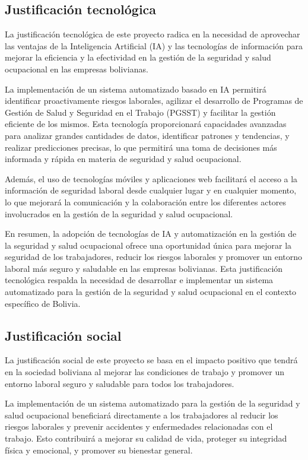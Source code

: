 \subsection{Justificación tecnológica}

La justificación tecnológica de este proyecto radica en la necesidad de aprovechar las ventajas de la Inteligencia Artificial (IA) y las tecnologías de información para mejorar la eficiencia y la efectividad en la gestión de la seguridad y salud ocupacional en las empresas bolivianas.

La implementación de un sistema automatizado basado en IA permitirá identificar proactivamente riesgos laborales, agilizar el desarrollo de Programas de Gestión de Salud y Seguridad en el Trabajo (PGSST) y facilitar la gestión eficiente de los mismos. Esta tecnología proporcionará capacidades avanzadas para analizar grandes cantidades de datos, identificar patrones y tendencias, y realizar predicciones precisas, lo que permitirá una toma de decisiones más informada y rápida en materia de seguridad y salud ocupacional.

Además, el uso de tecnologías móviles y aplicaciones web facilitará el acceso a la información de seguridad laboral desde cualquier lugar y en cualquier momento, lo que mejorará la comunicación y la colaboración entre los diferentes actores involucrados en la gestión de la seguridad y salud ocupacional.

En resumen, la adopción de tecnologías de IA y automatización en la gestión de la seguridad y salud ocupacional ofrece una oportunidad única para mejorar la seguridad de los trabajadores, reducir los riesgos laborales y promover un entorno laboral más seguro y saludable en las empresas bolivianas. Esta justificación tecnológica respalda la necesidad de desarrollar e implementar un sistema automatizado para la gestión de la seguridad y salud ocupacional en el contexto específico de Bolivia.

\subsection{Justificación social}

La justificación social de este proyecto se basa en el impacto positivo que tendrá en la sociedad boliviana al mejorar las condiciones de trabajo y promover un entorno laboral seguro y saludable para todos los trabajadores.

La implementación de un sistema automatizado para la gestión de la seguridad y salud ocupacional beneficiará directamente a los trabajadores al reducir los riesgos laborales y prevenir accidentes y enfermedades relacionadas con el trabajo. Esto contribuirá a mejorar su calidad de vida, proteger su integridad física y emocional, y promover su bienestar general.

